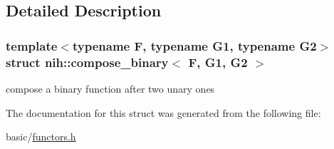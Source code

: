 \subsection{\-Detailed \-Description}
\subsubsection*{template$<$typename F, typename G1, typename G2$>$struct nih\-::compose\-\_\-binary$<$ F, G1, G2 $>$}

compose a binary function after two unary ones 

\-The documentation for this struct was generated from the following file\-:\begin{DoxyCompactItemize}
\item 
basic/\hyperlink{functors_8h}{functors.\-h}\end{DoxyCompactItemize}
